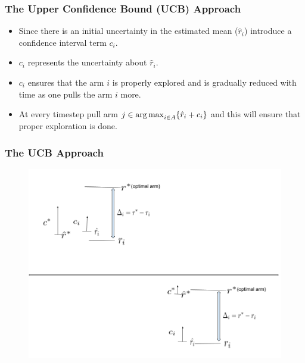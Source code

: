 

\begin{frame}
\frametitle{The Upper Confidence Bound (UCB) Approach}
\begin{itemize}
\item<1-> Since there is an initial uncertainty in the estimated mean ($\hat{r}_i$) introduce a confidence interval term $c_i$.
\item<2-> $c_i$ represents the uncertainty about $\hat{r}_i$.
\item<2-> $c_i$ ensures that the arm $i$ is properly explored and is gradually reduced with time as one pulls the arm $i$ more.
\item<3-> At every timestep pull arm $j\in \operatorname*{arg\,max}_{i\in A} \lbrace \hat{r}_i + c_i\rbrace$ and this will ensure that proper exploration is done. 
\end{itemize}
\end{frame}

\begin{frame}
\frametitle{The UCB Approach}
\begin{figure}
\includegraphics[scale=0.3]{img/UCB_Drawing.png}
\end{figure}
\end{frame}



